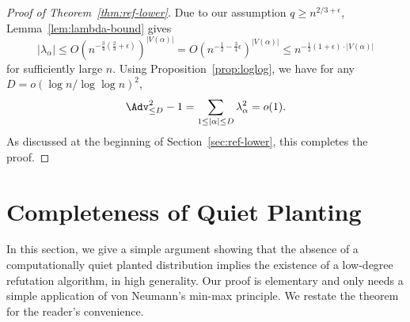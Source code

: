 \documentclass{article}
\begin{document}
\begin{proof}[Proof of Theorem~\ref{thm:ref-lower}]
Due to our assumption $q \ge n^{2/3+\epsilon}$, Lemma~\ref{lem:lambda-bound} gives
\[ |\lambda_\alpha| \le O(n^{-\frac{3}{4}(\frac{2}{3}+\epsilon)})^{|V(\alpha)|} = O(n^{-\frac{1}{2} -\frac{3}{4}\epsilon})^{|V(\alpha)|} \le n^{-\frac{1}{2}(1+\epsilon) \cdot |V(\alpha)|} \]
for sufficiently large $n$. Using Proposition~\ref{prop:loglog}, we have for any $D = o(\log n/\log \log n)^2$,
\[ \Adv^2_{\le D} - 1 = \sum_{1 \le |\alpha| \le D} \lambda_\alpha^2 = o(1). \]
As discussed at the beginning of Section~\ref{sec:ref-lower}, this completes the proof.
\end{proof}


\section{Completeness of Quiet Planting}


In this section, we give a simple argument showing that the absence of a computationally quiet planted distribution implies the existence of a low-degree refutation algorithm, in high generality. Our proof is elementary and only needs a simple application of von Neumann's min-max principle. We restate the theorem for the reader's convenience.



\thmrefduality*
\end{document}
